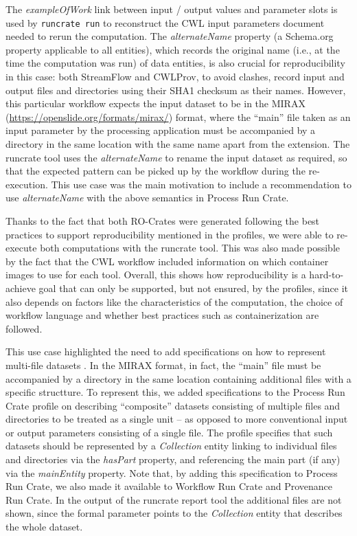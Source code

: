 \documentclass[10pt,letterpaper]{article}
\begin{document}
\begin{figure}
\begin{adjustwidth}{-0.5cm}{0in}
\end{adjustwidth}
\end{figure}



The \emph{exampleOfWork} link between input / output values and parameter slots is used by \texttt{runcrate run} to reconstruct the CWL input parameters document needed to rerun the computation.
The
\emph{alternateName} property (a Schema.org property applicable to all entities), which records the original name (i.e., at the time the computation was run) of data entities, is also crucial for reproducibility in this case: both StreamFlow and CWLProv, to avoid clashes, record input and output files and directories using their SHA1
checksum as their names. 
However, this particular workflow expects the input dataset to be in the MIRAX (\url{https://openslide.org/formats/mirax/}) format, where the ``main'' file taken as an input parameter by the processing application must be accompanied by a directory in the same location with the same name apart from the extension.
The runcrate tool uses the \emph{alternateName} to rename the input dataset as required, so that the expected pattern can be picked up by the workflow during the re-execution.
This use case was the main motivation to include a recommendation to use \emph{alternateName} with the above semantics in Process Run Crate.

Thanks to the fact that both RO-Crates were generated following the best practices to support reproducibility mentioned in the profiles, we were able to re-execute both computations with the runcrate tool.
This was also made possible by the fact that the CWL workflow included information on which container images to use for each tool.
Overall, this shows how reproducibility is a hard-to-achieve goal that can only be supported, but not ensured, by the profiles, since it also depends on factors like the characteristics of the computation, the choice of workflow language and whether best practices such as containerization are followed.

This use case highlighted the need to add specifications on how to represent multi-file datasets \cite[section Representing multi-file objects]{WRROC 2023a}. In the MIRAX format, in fact, the ``main'' file must be accompanied by a directory in the same location containing additional files with a specific structture.
To represent this, we added specifications to the Process Run Crate profile on describing “composite” datasets consisting of multiple files and directories to be treated as a single unit -- as opposed to more conventional input or output parameters consisting of a single file. The profile specifies that such datasets should be represented by a \emph{Collection} entity linking to individual files and directories via the \emph{hasPart} property, and referencing the main part (if any) via the \emph{mainEntity} property. Note that, by adding this specification to Process Run Crate, we also made it available to Workflow Run Crate and Provenance Run Crate. In the output of the runcrate report tool the additional files are not shown, since the formal parameter points to the \emph{Collection} entity that describes the whole dataset.
\end{document}
